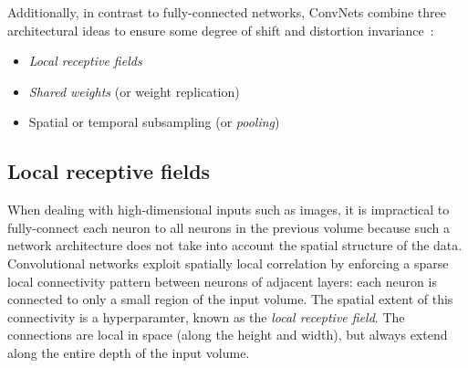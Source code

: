 \documentclass[../main.tex]{subfiles}
\begin{document}
Additionally, in contrast to fully-connected networks, ConvNets combine three
architectural ideas to ensure some degree of shift and distortion
invariance~\cite{lecun1995convolutional}:
%
\begin{itemize}
  \item \emph{Local receptive fields}
  \item \emph{Shared weights} (or weight replication)
  \item Spatial or temporal subsampling (or \emph{pooling})
\end{itemize}
%
\subsection{Local receptive fields}
When dealing with high-dimensional inputs such as images, it is impractical to
fully-connect each neuron to all neurons in the previous volume because such a
network architecture does not take into account the spatial structure of the
data.
%
Convolutional networks exploit spatially local correlation by enforcing a
sparse local connectivity pattern between neurons of adjacent layers: each
neuron is connected to only a small region of the input volume.
%
The spatial extent of this connectivity is a hyperparamter, known as the
\emph{local receptive field}.
%
The connections are local in space (along the height and width), but always
extend along the entire depth of the input volume.
\end{document}
